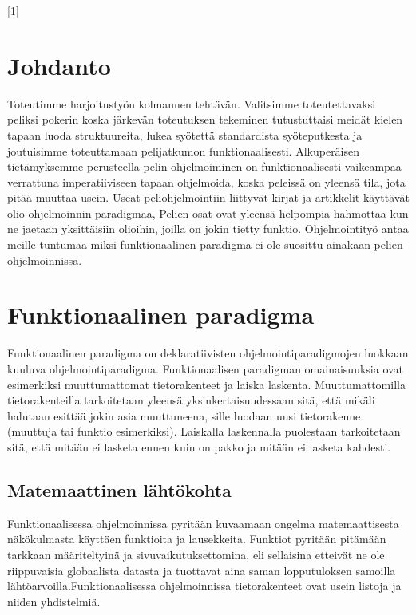 \documentclass[12pt]{article}
\begin{document}
[1]
{}
{}
% 

\maketitle
\section{Johdanto}
Toteutimme harjoitustyön kolmannen tehtävän.
Valitsimme toteutettavaksi peliksi pokerin koska järkevän toteutuksen tekeminen tutustuttaisi meidät kielen tapaan luoda struktuureita,
lukea syötettä standardista syöteputkesta ja joutuisimme toteuttamaan pelijatkumon funktionaalisesti. Alkuperäisen tietämyksemme perusteella pelin ohjelmoiminen on funktionaalisesti vaikeampaa verrattuna imperatiiviseen tapaan ohjelmoida, koska peleissä on yleensä tila, jota pitää muuttaa usein. Useat peliohjelmointiin liittyvät kirjat ja artikkelit käyttävät olio-ohjelmoinnin paradigmaa, Pelien osat ovat yleensä helpompia hahmottaa kun ne jaetaan yksittäisiin olioihin, joilla on jokin tietty funktio. Ohjelmointityö antaa meille tuntumaa miksi funktionaalinen paradigma ei ole suosittu ainakaan pelien ohjelmoinnissa.

\section{Funktionaalinen paradigma}
Funktionaalinen paradigma on deklaratiivisten ohjelmointiparadigmojen luokkaan kuuluva ohjelmointiparadigma. Funktionaalisen paradigman omainaisuuksia ovat esimerkiksi muuttumattomat tietorakenteet ja laiska laskenta. Muuttumattomilla tietorakenteilla tarkoitetaan yleensä yksinkertaisuudessaan sitä, että mikäli halutaan esittää jokin asia muuttuneena, sille luodaan uusi tietorakenne (muuttuja tai funktio esimerkiksi). Laiskalla laskennalla puolestaan tarkoitetaan sitä, että mitään ei lasketa ennen kuin on pakko ja mitään ei lasketa kahdesti.

\subsection{Matemaattinen lähtökohta}
Funktionaalisessa ohjelmoinnissa pyritään kuvaamaan ongelma matemaattisesta näkökulmasta käyttäen funktioita ja lausekkeita. Funktiot pyritään pitämään tarkkaan määriteltyinä ja sivuvaikutuksettomina, eli sellaisina etteivät ne ole riippuvaisia globaalista datasta ja tuottavat aina saman lopputuloksen samoilla lähtöarvoilla.Funktionaalisessa ohjelmoinnissa tietorakenteet ovat usein listoja ja niiden yhdistelmiä.
\end{document}
